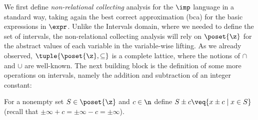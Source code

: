 
We first define \emph{non-relational collecting} analysis for the
\(\imp\) language in a standard way, taking again the best correct
approximation (bca) for the basic expressions in \(\expr\).  Unlike
the Intervals domain, where we needed to define the set of intervals,
the non-relational collecting analysis will rely on \(\poset{\z}\) for
the abstract values of each variable in the variable-wise lifting.  As
we already observed, \(\tuple{\poset{\z}, \subseteq}\) is a complete
lattice, where the notions of \(\cap\) and \(\cup\) are well-known.
The next building block is the definition of some more operations on
intervals, namely the addition and subtraction of an integer constant:

\begin{definition}
  For a nonempty set \(S \in \poset{\z}\) and \(c \in \n\) define
  \(S \pm c \veq \{x \pm c \mid x \in S\}\) (recall
  that \(\pm \infty + c = \pm\infty - c = \pm\infty\)).
\end{definition}
